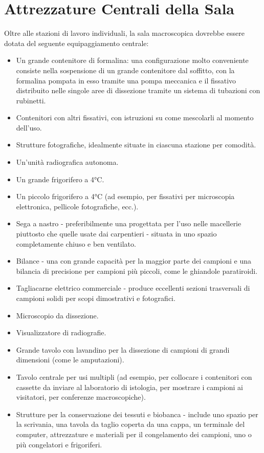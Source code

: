 \section{Attrezzature Centrali della Sala}
Oltre alle stazioni di lavoro individuali, la sala macroscopica dovrebbe essere dotata del seguente equipaggiamento centrale:
\begin{itemize}
    \item Un grande contenitore di formalina: una configurazione molto conveniente consiste nella sospensione di un grande contenitore dal soffitto, con la formalina pompata in esso tramite una pompa meccanica e il fissativo distribuito nelle singole aree di dissezione tramite un sistema di tubazioni con rubinetti.
    \item Contenitori con altri fissativi, con istruzioni su come mescolarli al momento dell'uso.
    \item Strutture fotografiche, idealmente situate in ciascuna stazione per comodità.
    \item Un'unità radiografica autonoma.
    \item Un grande frigorifero a 4°C.
    \item Un piccolo frigorifero a 4°C (ad esempio, per fissativi per microscopia elettronica, pellicole fotografiche, ecc.).
    \item Sega a nastro - preferibilmente una progettata per l'uso nelle macellerie piuttosto che quelle usate dai carpentieri - situata in uno spazio completamente chiuso e ben ventilato.
    \item Bilance - una con grande capacità per la maggior parte dei campioni e una bilancia di precisione per campioni più piccoli, come le ghiandole paratiroidi.
    \item Tagliacarne elettrico commerciale - produce eccellenti sezioni trasversali di campioni solidi per scopi dimostrativi e fotografici.
    \item Microscopio da dissezione.
    \item Visualizzatore di radiografie.
    \item Grande tavolo con lavandino per la dissezione di campioni di grandi dimensioni (come le amputazioni).
    \item Tavolo centrale per usi multipli (ad esempio, per collocare i contenitori con cassette da inviare al laboratorio di istologia, per mostrare i campioni ai visitatori, per conferenze macroscopiche).
    \item Strutture per la conservazione dei tessuti e biobanca - include uno spazio per la scrivania, una tavola da taglio coperta da una cappa, un terminale del computer, attrezzature e materiali per il congelamento dei campioni, uno o più congelatori e frigoriferi.
\end{itemize}

